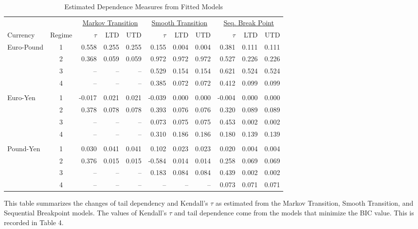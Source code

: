 \begin{landscape}
\begin{table}
	\centering
	\begin{threeparttable}
		\caption{Estimated Dependence Measures from Fitted Models}	\label{tbl:dependence_measure_summary}
		\begin{tabular}[c]{l c r r r | r r r | r r r}
			\midrule
					 &        & \multicolumn{3}{c}{\underline{Markov Transition}} & \multicolumn{3}{c}{\underline{Smooth Transition}} & \multicolumn{3}{c}{\underline{Seq. Break Point}} \\
			Currency & Regime & $\tau$ & LTD & UTD & $\tau$ & LTD & UTD & $\tau$ & LTD & UTD \\
			\midrule
			Euro-Pound  & 1 &  0.558 & 0.255 & 0.255 &  0.155 & 0.004 & 0.004 &  0.381 & 0.111 & 0.111 \\
						& 2 &  0.368 & 0.059 & 0.059 &  0.972 & 0.972 & 0.972 &  0.527 & 0.226 & 0.226 \\
						& 3 &     -- &    -- &    -- &  0.529 & 0.154 & 0.154 &  0.621 & 0.524 & 0.524 \\
						& 4 &     -- &    -- &    -- &  0.385 & 0.072 & 0.072 &  0.412 & 0.099 & 0.099 \\ \\
			Euro-Yen    & 1 & -0.017 & 0.021 & 0.021 & -0.039 & 0.000 & 0.000 & -0.004 & 0.000 & 0.000 \\
						& 2 &  0.378 & 0.078 & 0.078 &  0.393 & 0.076 & 0.076 &  0.320 & 0.089 & 0.089 \\
						& 3 &     -- &    -- &    -- &  0.073 & 0.075 & 0.075 &  0.453 & 0.002 & 0.002 \\
						& 4 &     -- &    -- &    -- &  0.310 & 0.186 & 0.186 &  0.180 & 0.139 & 0.139 \\ \\
			Pound-Yen   & 1 &  0.030 & 0.041 & 0.041 &  0.102 & 0.023 & 0.023 &  0.020 & 0.004 & 0.004 \\
						& 2 &  0.376 & 0.015 & 0.015 & -0.584 & 0.014 & 0.014 &  0.258 & 0.069 & 0.069 \\
						& 3 &     -- &    -- &    -- &  0.183 & 0.084 & 0.084 &  0.439 & 0.002 & 0.002 \\
						& 4 &     -- &    -- &    -- &     -- &    -- &    -- &  0.073 & 0.071 & 0.071 \\
			\hline
		\end{tabular}
		\begin{tablenotes}
			\item{\footnotesize This table summarizes the changes of tail dependency and Kendall's $\tau$ as estimated from the Markov Transition, Smooth Transition, and Sequential Breakpoint models. The values of Kendall's $\tau$ and tail dependence come from the models that minimize the BIC value. This is recorded in Table 4.}
		\end{tablenotes}
	\end{threeparttable}
\end{table}

\end{landscape}

